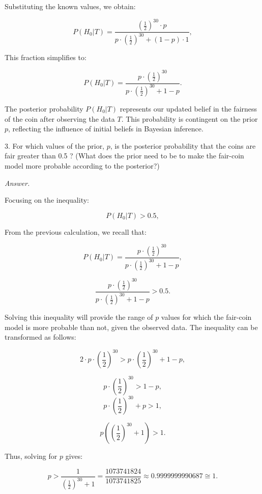 \documentclass[12pt]{article}
\begin{document}
Substituting the known values, we obtain:

\[
P(H_0 | T) = \frac{\left(\frac{1}{2}\right)^{30} \cdot p}{p \cdot \left(\frac{1}{2}\right)^{30} + (1 - p) \cdot 1},
\]

This fraction simplifies to:

\[
P(H_0 | T) = \frac{p \cdot \left(\frac{1}{2}\right)^{30}}{p \cdot \left(\frac{1}{2}\right)^{30} + 1 - p}.
\]

The posterior probability \( P(H_0 | T) \) represents our updated belief in the fairness of the coin after observing the data \( T \). This probability is contingent on the prior \( p \), reflecting the influence of initial beliefs in Bayesian inference.

\begin{q}
3. For which values of the prior, \(p\), is the posterior probability that the coins are fair greater than 0.5 ? (What does the prior need to be to make the fair-coin model more probable according to the posterior?)
\end{q}

\textit{Answer.}

Focusing on the inequality:

\[
P(H_0 | T) > 0.5,
\]

From the previous calculation, we recall that:

\[
P(H_0 | T) = \frac{p \cdot \left(\frac{1}{2}\right)^{30}}{p \cdot \left(\frac{1}{2}\right)^{30} + 1 - p},
\]

\[
\frac{p \cdot \left(\frac{1}{2}\right)^{30}}{p \cdot \left(\frac{1}{2}\right)^{30} + 1 - p} > 0.5.
\]

Solving this inequality will provide the range of \( p \) values for which the fair-coin model is more probable than not, given the observed data. The inequality can be transformed as follows:

\[
2 \cdot p \cdot \left(\frac{1}{2}\right)^{30} > p \cdot \left(\frac{1}{2}\right)^{30} + 1 - p,
\]

\[
p \cdot \left(\frac{1}{2}\right)^{30} > 1 - p,
\]
\[
p \cdot \left(\frac{1}{2}\right)^{30} + p > 1,
\]

\[
p \left(\left(\frac{1}{2}\right)^{30} + 1\right) > 1.
\]

Thus, solving for \( p \) gives:

\[
p > \frac{1}{\left(\frac{1}{2}\right)^{30} + 1} = \frac{1073741824}{1073741825} \approx 0.9999999990687 \cong 1. 
\]
\end{document}
